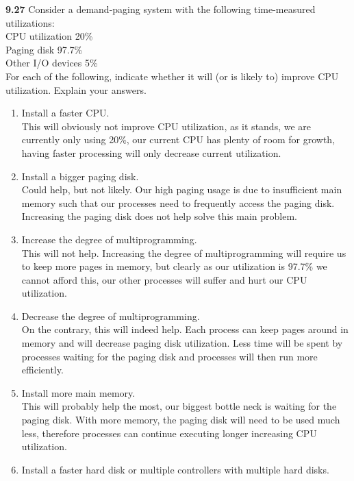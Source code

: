\documentclass[12pt]{jhwhw}
\begin{document}
	\begin{addmargin}[1em]{}
	\end{addmargin}

\textbf{9.27}  
	Consider a demand-paging system with the following time-measured utilizations: \\
	CPU utilization 20\% \\
	Paging disk 97.7\% \\
	Other I/O devices 5\% \\
	For each of the following, indicate whether it will (or is likely to) improve
	CPU utilization. Explain your answers.
	\begin{enumerate}
		\item Install a faster CPU. \\
			This will obviously not improve CPU utilization, as it stands, we are currently
			only using 20\%, our current CPU has plenty of room for growth, having faster
			processing will only decrease current utilization.
		\item Install a bigger paging disk. \\
			Could help, but not likely. Our high paging usage is due to insufficient main
			memory such that our processes need to frequently access the paging disk.
			Increasing the paging disk does not help solve this main problem.
		\item Increase the degree of multiprogramming. \\
			This will not help. Increasing the degree of multiprogramming will require us to 
			keep more pages in memory, but clearly as our utilization is 97.7\% we cannot
			afford this, our other processes will suffer and hurt our CPU utilization.
		\item Decrease the degree of multiprogramming. \\
			On the contrary, this will indeed help. Each process can keep pages around in
			memory and will decrease paging disk utilization. Less time will be spent
			by processes waiting for the paging disk and processes will then run more efficiently.
		\clearpage
		\item Install more main memory. \\
			This will probably help the most, our biggest bottle neck is waiting for the paging
			disk. With more memory, the paging disk will need to be used much less,
			therefore processes can continue executing longer increasing CPU utilization.
		\item Install a faster hard disk or multiple controllers with multiple hard disks. \\

\end{enumerate}
\end{document}
